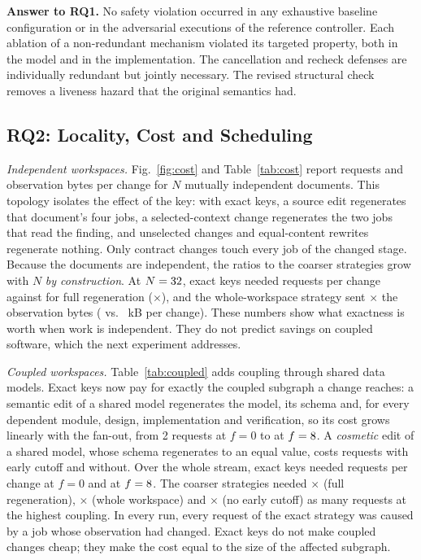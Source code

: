\textbf{Answer to RQ1.} No safety violation occurred in any exhaustive baseline configuration or in the \AblRuns{} adversarial executions of the reference controller. Each ablation of a non-redundant mechanism violated its targeted property, both in the model and in the implementation. The cancellation and recheck defenses are individually redundant but jointly necessary. The revised structural check removes a liveness hazard that the original semantics had.

\subsection{RQ2: Locality, Cost and Scheduling}\label{sec:rq2}
\emph{Independent workspaces.} Fig.~\ref{fig:cost} and Table~\ref{tab:cost} report requests and observation bytes per change for $N$ mutually independent documents. This topology isolates the effect of the key: with exact keys, a source edit regenerates that document's four jobs, a selected-context change regenerates the two jobs that read the finding, and unselected changes and equal-content rewrites regenerate nothing. Only contract changes touch every job of the changed stage. Because the documents are independent, the ratios to the coarser strategies grow with $N$ \emph{by construction}. At $N=32$, exact keys needed \ExactReqMaxN{} requests per change against \FullReqMaxN{} for full regeneration (\RatioFull$\times$), and the whole-workspace strategy sent \BytesRatioWorkspace$\times$ the observation bytes (\WorkspaceKBMaxN{} vs.\ \ExactKBMaxN{} kB per change). These numbers show what exactness is worth when work is independent. They do not predict savings on coupled software, which the next experiment addresses.




\emph{Coupled workspaces.} Table~\ref{tab:coupled} adds coupling through shared data models. Exact keys now pay for exactly the coupled subgraph a change reaches: a semantic edit of a shared model regenerates the model, its schema and, for every dependent module, design, implementation and verification, so its cost grows linearly with the fan-out, from 2 requests at $f=0$ to \CoupledSemanticFmax{} at $f=8$. A \emph{cosmetic} edit of a shared model, whose schema regenerates to an equal value, costs \CoupledCosmeticExact{} requests with early cutoff and \CoupledCosmeticNoCut{} without. Over the whole stream, exact keys needed \CoupledExactFzero{} requests per change at $f=0$ and \CoupledExactFmax{} at $f=8$. The coarser strategies needed \CoupledRatioFullFmax$\times$ (full regeneration), \CoupledRatioWorkspaceFmax$\times$ (whole workspace) and \CoupledRatioCutoffFmax$\times$ (no early cutoff) as many requests at the highest coupling. In every run, every request of the exact strategy was caused by a job whose observation had changed. Exact keys do not make coupled changes cheap; they make the cost equal to the size of the affected subgraph.

